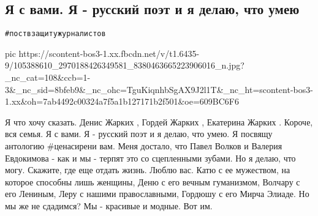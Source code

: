  
 
 
 
 
\subsection{Я с вами. Я - русский поэт и я делаю, что умею}
\verb|#поствзащитужурналистов|

\ifcmt
  pic https://scontent-bos3-1.xx.fbcdn.net/v/t1.6435-9/105388610_2970188426349581_8380463665223906016_n.jpg?_nc_cat=108&ccb=1-3&_nc_sid=8bfeb9&_nc_ohc=TguKiqnhbSgAX9J2l1T&_nc_ht=scontent-bos3-1.xx&oh=7ab4492c00324a7f5a1b127171b2f501&oe=609BC6F6
\fi

Я что хочу сказать. Денис Жарких , Гордей Жарких , Екатерина Жарких . Короче,
вся семья. Я с вами. Я - русский поэт и я делаю, что умею. Я посвящу антологию
#ценасирени вам. Меня достало, что Павел Волков и Валерия Евдокимова - как и мы
- терпят это со сцепленными зубами. Но я делаю, что могу. Скажите, где еще
отдать жизнь. Люблю вас. Катю с ее мужеством, на которое способны лишь женщины,
Деню с его вечным гуманизмом, Волчару с его Лениным, Леру с нашими
православными, Гордюшу с его Мирча Элиаде. Но мы же не сдадимся? Мы - красивые
и модные. Вот им.
